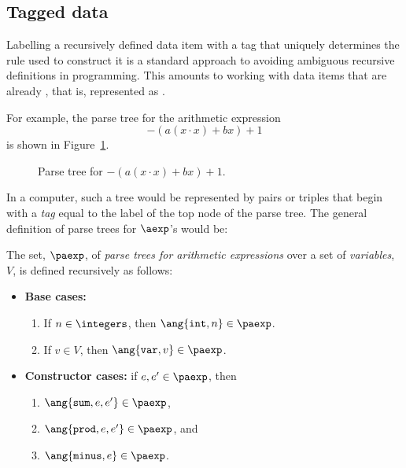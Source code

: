 \begin{editingnotes}

\section{Tagged data}

Labelling a recursively defined data item with a tag that uniquely
determines the rule used to construct it is a standard approach to
avoiding ambiguous recursive definitions in programming.  This
amounts to working with data items that are already , that
is, represented as .

For example, the parse tree for the arithmetic expression
\begin{equation}\label{ax}
-(a(x\cdot x)+ bx) + 1
\end{equation}
is shown in Figure~\ref{fig:parse}.

\begin{figure}[htbp]
\caption{Parse tree for $-(a(x\cdot x)+ bx) + 1$.}
\label{fig:parse}
\end{figure}

In a computer, such a tree would be represented by pairs or triples
that begin with a
\emph{tag} equal to the label of the top node of the parse tree.  
The general definition of parse trees for $\aexp$'s would be:

\begin{definition}\label{arithparse}
The set, $\paexp$, of \emph{parse trees for arithmetic expressions} 
over a set of
\emph{variables}, $V$, is defined recursively as follows:
\begin{itemize}
\item \textbf{Base cases:}
\begin{enumerate}
\item If $n \in \integers$, then $\ang{\texttt{int}, n} \in \paexp$.
\item If $v \in V$, then $\ang{\texttt{var}, v} \in \paexp$.
\end{enumerate}
\item \textbf{Constructor cases:} if $e,e' \in \paexp$, then
\begin{enumerate}
\item $\ang{\texttt{sum}, e, e'} \in \paexp$,
\item $\ang{\texttt{prod}, e, e'} \in \paexp$, and
\item $\ang{\texttt{minus}, e} \in \paexp$.
\end{enumerate}
\end{itemize}
\end{definition}


\end{editingnotes}
